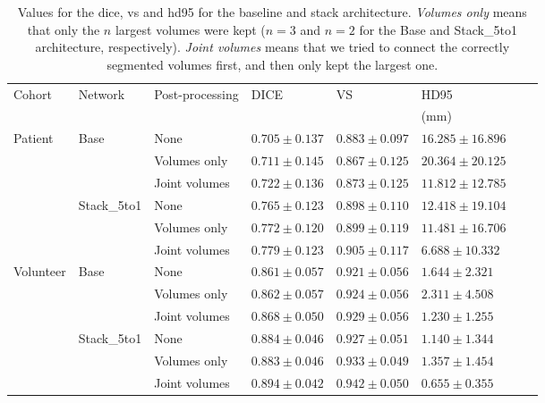 \begin{table}[htbp]
   \centering
   \caption[Segmentation Evaluation Metrics for the different Architectures]{Values for the \acrlong{dice}, \acrlong{vs} and \acrlong{hd95} for the baseline and stack architecture. \textit{Volumes only} means that only the $n$ largest volumes were kept ($n = 3$ and $n = 2$ for the Base and Stack\_5to1 architecture, respectively). \textit{Joint volumes} means that we tried to connect the correctly segmented volumes first, and then only kept the largest one.}
   \begin{tabular}{l*{7}{l}}
      \toprule
      Cohort	& Network	& Post-processing	& DICE				& VS				& HD95\\
      			&					&					&					&					& (mm)\\
      \midrule
      Patient   & Base 	& None & $0.705 \pm 0.137$ & $\mathbf{0.883 \pm 0.097}$ & $16.285 \pm 16.896$\\
                &                	& Volumes only  & $0.711 \pm 0.145$ & $0.867 \pm 0.125$ & $20.364 \pm 20.125$\\
                &                	& Joint volumes & $\mathbf{0.722 \pm 0.136}$ & $0.873 \pm 0.125$ & $\mathbf{11.812 \pm 12.785}$\\
      \cmidrule{2-6}
                & Stack\_5to1 	& None & $0.765 \pm 0.123$ & $0.898 \pm 0.110$ & $12.418 \pm 19.104$\\
                &                	& Volumes only  & $0.772 \pm 0.120$ & $0.899 \pm 0.119$ & $11.481 \pm 16.706$\\
                &                	& Joint volumes      & $\mathbf{0.779 \pm 0.123}$ & $\mathbf{0.905 \pm 0.117}$ & $\mathbf{6.688  \pm 10.332}$\\
      \midrule
      Volunteer & Base 	& None & $0.861 \pm 0.057$ & $0.921 \pm 0.056$ & $1.644  \pm 2.321 $\\
                &                	& Volumes only  & $0.862 \pm 0.057$ & $0.924 \pm 0.056$ & $2.311  \pm 4.508 $\\
                &                	& Joint volumes      & $\mathbf{0.868 \pm 0.050}$ & $\mathbf{0.929 \pm 0.056}$ & $\mathbf{1.230  \pm 1.255}$\\
      \cmidrule{2-6}
                & Stack\_5to1 	& None & $0.884 \pm 0.046$ & $0.927 \pm 0.051$ & $1.140  \pm 1.344 $\\
                &                	& Volumes only  & $0.883 \pm 0.046$ & $0.933 \pm 0.049$ & $1.357  \pm 1.454 $\\
                &                	& Joint volumes      & $\mathbf{0.894 \pm 0.042}$ & $\mathbf{0.942 \pm 0.050}$ & $\mathbf{0.655  \pm 0.355}$\\
      \bottomrule
   \end{tabular}
   \label{tab:results_pp_small}
\end{table}

